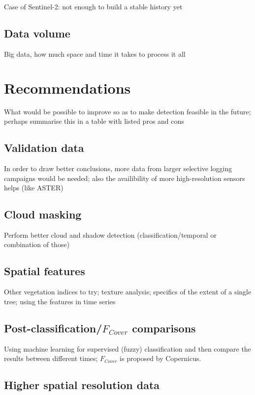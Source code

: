 \documentclass[a4paper,12pt]{scrbook}
\begin{document}
Case of Sentinel-2: not enough to build a stable history yet

\subsection{Data volume}

Big data, how much space and time it takes to process it all

\section{Recommendations}

What would be possible to improve so as to make detection feasible in the future; perhaps summarise this in a table with listed pros and cons

\subsection{Validation data}

In order to draw better conclusions, more data from larger selective logging campaigns would be needed; also the availibility of more high-resolution sensors helps (like ASTER)

\subsection{Cloud masking}

Perform better cloud and shadow detection (classification/temporal or combination of those)

\subsection{Spatial features}

Other vegetation indices to try; texture analysis; specifics of the extent of a single tree; using the features in time series

\subsection{Post-classification/$F_{Cover}$ comparisons}

Using machine learning for supervised (fuzzy) classification and then compare the results between different times; $F_{Cover}$ is proposed by Copernicus.

\subsection{Higher spatial resolution data}
\end{document}
